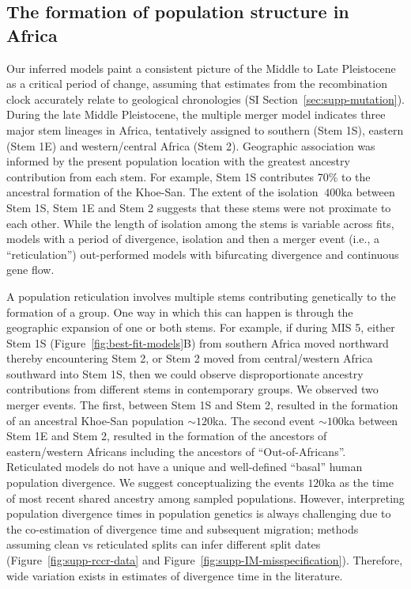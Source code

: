 \documentclass[]{article}
\begin{document}
\subsection*{The formation of population structure in Africa}

Our inferred models paint a consistent picture of the Middle to Late
Pleistocene as a critical period of change, assuming that estimates from the
recombination clock accurately relate to geological chronologies (SI
Section~\ref{sec:supp-mutation}). During the late Middle Pleistocene, the
multiple merger model indicates three major stem lineages in Africa,
tentatively assigned to southern (Stem 1S), eastern (Stem 1E) and
western/central Africa (Stem 2). Geographic association was informed by the
present population location with the greatest ancestry contribution from each
stem. For example, Stem 1S contributes 70\% to the ancestral formation of the
Khoe-San. The extent of the isolation $\>400$ka between Stem 1S, Stem 1E and Stem
2 suggests that these stems were not proximate to each other. While the length
of isolation among the stems is variable across fits, models with a period of
divergence, isolation and then a merger event (i.e., a ``reticulation'')
out-performed models with bifurcating divergence and continuous gene flow. 

A population reticulation involves multiple stems contributing genetically to
the formation of a group. One way in which this can happen is through the
geographic expansion of one or both stems. For example, if during MIS 5, either
Stem 1S (Figure~\ref{fig:best-fit-models}B) from southern Africa moved
northward thereby encountering Stem 2, or Stem 2 moved from central/western
Africa southward into Stem 1S, then we could observe disproportionate
ancestry contributions from different stems in contemporary groups. We observed
two merger events. The first, between Stem 1S and Stem 2, resulted in the
formation of an ancestral Khoe-San population $\sim120$ka. The second event
$\sim100$ka between Stem 1E and Stem 2, resulted in the formation of the
ancestors of eastern/western Africans including the ancestors of
``Out-of-Africans''.
Reticulated models do not have a unique and 
well-defined ``basal'' human population divergence.
We suggest conceptualizing the events $120$ka as the time of most recent
shared ancestry among sampled populations.
However, interpreting population divergence times in population genetics is 
always challenging due
to the co-estimation of divergence time and subsequent migration;
methods assuming clean vs reticulated splits can infer different split dates
(Figure~\ref{fig:supp-rccr-data} and Figure~\ref{fig:supp-IM-misspecification}).
Therefore, wide variation exists in estimates of divergence time in the
literature\citep{Bergstrom2021-iw,Henn2018-rf}.
\end{document}
